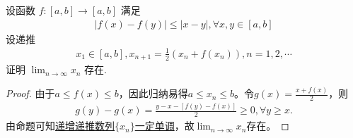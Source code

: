 \documentclass[../../main.tex]{subfiles}
\begin{document}
\begin{example}
设函数 $f:[a,b] \to [a,b]$ 满足
\begin{align*}
|f(x) - f(y)| \leqslant |x - y|, \forall x,y \in [a,b]
\end{align*}
设递推
\begin{align*}
x_1 \in [a,b], x_{n+1} = \frac{1}{2}(x_n + f(x_n)), n = 1,2,\cdots
\end{align*}
证明 $\lim_{n \to \infty} x_n$ 存在.
\end{example}
\begin{proof}
由于$a \leqslant f(x) \leqslant b$，因此归纳易得$a \leqslant x_n \leqslant b$。令$g(x) = \frac{x + f(x)}{2}$，则
\begin{align*}
g(y) - g(x) = \frac{y - x - [f(y) - f(x)]}{2} \geqslant 0, \forall y \geqslant x.
\end{align*}
由命题可知\hyperref[proposition:递增函数递推数列]{递增递推数列$\{ x_n \}$一定单调}，故$\lim_{n \to \infty} x_n$存在。
\end{proof}
\end{document}
